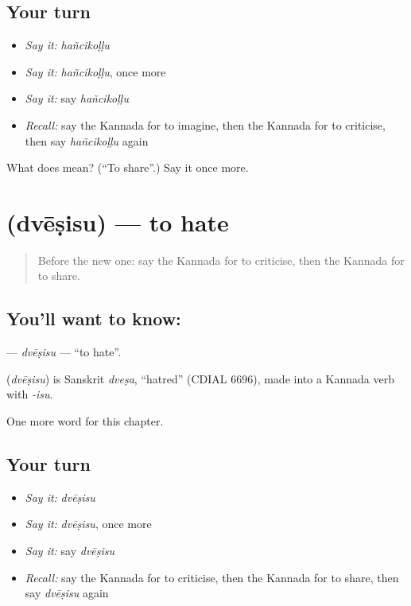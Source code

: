 \subsection*{Your turn}
\begin{itemize}
\raggedright
  \item \emph{Say it:} \emph{hañcikoḷḷu}
  \item \emph{Say it:} \emph{hañcikoḷḷu}, once more
  \item \emph{Say it:} say \emph{hañcikoḷḷu}
  \item \emph{Recall:} say the Kannada for to imagine, then the Kannada for to criticise, then say \emph{hañcikoḷḷu} again
\end{itemize}

\begin{tcolorbox}[breakable,colback=teal!4,colframe=teal!35!black,title={Before you move on}]
What does  mean? (\textquotedblleft{}To share\textquotedblright{}.) Say it once more.
\end{tcolorbox}
\section[\texorpdfstring{\kn{ದ್ವೇಷಿಸು} (dvēṣisu)}{ದ್ವೇಷಿಸು (dvēṣisu)}]{ (dvēṣisu) — to hate}

\label{lesson:KA-C241-dvesisu}



\begin{quote}
Before the new one: say the Kannada for to criticise, then the Kannada for to share.
\end{quote}

\subsection*{You'll want to know: }
\textbf{} — \emph{dvēṣisu} — \textquotedblleft{}to hate\textquotedblright{}.

\begin{cousinweb}
\textbf{} (\emph{dvēṣisu}) is Sanskrit \emph{dveṣa}, \textquotedblleft{}hatred\textquotedblright{} (CDIAL 6696), made into a Kannada verb with \emph{-isu}.
\end{cousinweb}

\begin{grammarlens}[title={What you've built}]
One more word for this chapter.
\end{grammarlens}

\subsection*{Your turn}
\begin{itemize}
\raggedright
  \item \emph{Say it:} \emph{dvēṣisu}
  \item \emph{Say it:} \emph{dvēṣisu}, once more
  \item \emph{Say it:} say \emph{dvēṣisu}
  \item \emph{Recall:} say the Kannada for to criticise, then the Kannada for to share, then say \emph{dvēṣisu} again
\end{itemize}

